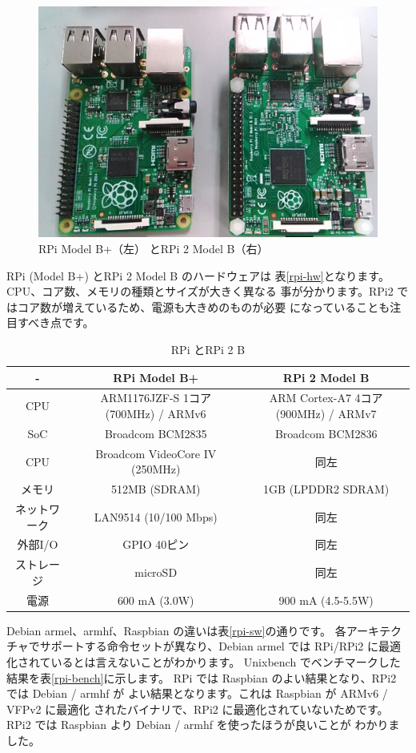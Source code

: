 \documentclass[mingoth,a4paper]{jsarticle}
\begin{document}
\begin{figure}[htbp]
\begin{center}
\includegraphics[width=0.7\hsize]{image201503/rpis.png}
\end{center}
\caption{RPi Model B+（左） とRPi 2 Model B（右）}
\label{fig:rpis}
\end{figure}

RPi (Model B+) とRPi 2 Model B のハードウェアは
表\ref{rpi-hw}となります。CPU、コア数、メモリの種類とサイズが大きく異なる
事が分かります。RPi2 ではコア数が増えているため、電源も大きめのものが必要
になっていることも注目すべき点です。
\begin{table}
\caption{RPi とRPi 2 B}
\begin{center}
\begin{tabular}{|c|c|c|}
\hline
-   & RPi Model B+ & RPi 2 Model B \\
\hline
CPU  & ARM1176JZF-S 1コア (700MHz) / ARMv6 & ARM Cortex-A7 4コア (900MHz) / ARMv7\\
SoC  & Broadcom BCM2835 &  Broadcom BCM2836 \\  
CPU  & Broadcom VideoCore IV (250MHz) & 同左 \\
メモリ & 512MB (SDRAM)& 1GB (LPDDR2 SDRAM) \\
ネットワーク & LAN9514 (10/100 Mbps) & 同左 \\
外部I/O & GPIO 40ピン & 同左 \\
ストレージ & microSD & 同左 \\
電源 & 600 mA (3.0W) & 900 mA (4.5-5.5W) \\
\hline
\end{tabular}
\label{fig:rpi-hw}
\end{center}
\end{table}

Debian armel、armhf、Raspbian の違いは表\ref{rpi-sw}の通りです。
各アーキテクチャでサポートする命令セットが異なり、Debian armel
では RPi/RPi2 に最適化されているとは言えないことがわかります。
Unixbench でベンチマークした結果を表\ref{rpi-bench}に示します。
RPi では Raspbian のよい結果となり、RPi2 では Debian / armhf が
よい結果となります。これは Raspbian が ARMv6 / VFPv2 に最適化
されたバイナリで、RPi2 に最適化されていないためです。
RPi2 では Raspbian より Debian / armhf を使ったほうが良いことが
わかりました。
\end{document}
